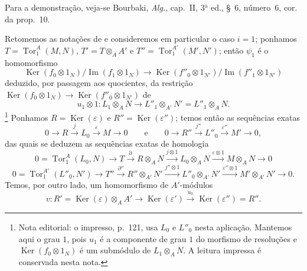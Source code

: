 Para a demonstração, veja-se Bourbaki, \emph{Alg.}, cap.~II, 3$^{\mathrm a}$ ed., \S~6, número~6, cor. da prop.~10.

\begin{env}[11.2.3]
\label{IV.11.2.3}
Retomemos as notações de  e consideremos em particular o caso $i=1$; ponhamos $T=\operatorname{Tor}_1^A(M,N)$, $T'=T\otimes_AA'$ e $T''=\operatorname{Tor}_1^{A'}(M',N')$; então $\psi_1$ é o homomorfismo
\[
\operatorname{Ker}(f_0\otimes1_N)/\operatorname{Im}(f_1\otimes1_N)
\to
\operatorname{Ker}(f''_0\otimes1_{N'})/
\operatorname{Im}(f''_1\otimes1_{N'})
\]
deduzido, por passagem aos quocientes, da restrição $\operatorname{Ker}(f_0\otimes1_N)\to\operatorname{Ker}(f''_0\otimes1_{N'})$ de
\[
u_1\otimes1:L_1\otimes_AN\to L''_1\otimes_{A'}N'=L''_1\otimes_AN.
\]\footnote{Nota editorial: o impresso, p.~121, usa $L_0$ e $L''_0$ nesta aplicação. Mantemos aqui o grau $1$, pois $u_1$ é a componente de grau $1$ do morfismo de resoluções e $\operatorname{Ker}(f_0\otimes1_N)$ é um submódulo de $L_1\otimes_AN$. A leitura impressa é conservada nesta nota.}
Ponhamos $R=\operatorname{Ker}(\varepsilon)$ e $R''=\operatorname{Ker}(\varepsilon'')$; temos então as sequências exatas
\[
0\to R\xrightarrow{j}L_0\xrightarrow{\varepsilon}M\to0
\qquad\text{e}\qquad
0\to R''\xrightarrow{j''}L''_0\xrightarrow{\varepsilon''}M'\to0,
\]
das quais se deduzem as sequências exatas de homologia
\begin{equation}
0=\operatorname{Tor}_1^A(L_0,N)\to T\xrightarrow{\partial}R\otimes_AN
\xrightarrow{j\otimes1}L_0\otimes_AN\xrightarrow{\varepsilon\otimes1}
M\otimes_AN\to0
\label{IV.11.2.3.1}
\tag{11.2.3.1}
\end{equation}
\begin{equation}
0=\operatorname{Tor}_1^{A'}(L''_0,N')\to T''\xrightarrow{\partial''}
R''\otimes_{A'}N'\xrightarrow{j''\otimes1}L''_0\otimes_{A'}N'
\xrightarrow{\varepsilon''\otimes1}M'\otimes_{A'}N'\to0.
\label{IV.11.2.3.2}
\tag{11.2.3.2}
\end{equation}
Temos, por outro lado, um homomorfismo de $A'$-módulos
\[
v:R'=\operatorname{Ker}(\varepsilon)\otimes_AA'
\to\operatorname{Ker}(\varepsilon')\xrightarrow{u_0}
\operatorname{Ker}(\varepsilon'')=R''.
\]
\end{env}


